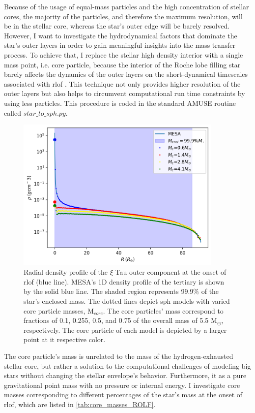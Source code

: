 Because of the usage of equal-mass particles and the high concentration of stellar cores, the majority of the particles, and therefore the maximum resolution, will be in the stellar core, whereas the star's outer edge will be barely resolved. However, I want to investigate the hydrodynamical factors that dominate the star's outer layers in order to gain meaningful insights into the mass transfer process. To achieve that, I replace the stellar high density interior with a single mass point, i.e. core particle, because the interior of the Roche lobe filling star barely affects the dynamics of the outer layers on the short-dynamical timescales associated with \ac{rlof} \citep{deupree2005structure}. This technique not only provides higher resolution of the outer layers but also helps to circumvent computational run time constraints by using less particles. This procedure is coded in the standard AMUSE routine called $star\_to\_sph.py$.
\begin{figure}[H]
    \centering
    \includegraphics[width=0.9\textwidth]{Thesis/graphs/ROLF_density_profile.pdf}
    \caption{Radial density profile of the  $\xi$ Tau outer component at the onset of \ac{rlof} (blue line). MESA's 1D density profile of the tertiary is shown by the solid blue line. The shaded region represents 99.9\% of the star's enclosed mass. The dotted lines depict \ac{sph} models with varied core particle masses, M$_{core}$. The core particles' mass correspond to fractions of 0.1, 0.255, 0.5, and 0.75 of the overall mass of 5.5 M$_{\odot}$, respectively. The core particle of each model is depicted by a larger point at it respective color.}
    \label{fig:stellar_density_ROLF}
\end{figure}
The core particle's mass is unrelated to the mass of the hydrogen-exhausted stellar core, but rather a solution to the computational challenges of modeling big stars without changing the stellar envelope's behavior. Furthermore, it as a pure gravitational point mass with no pressure or internal energy. I investigate core masses corresponding to different percentages of the star's mass at the onset of \ac{rlof}, which are listed in \cref{tab:core_masses_ROLF}. 
